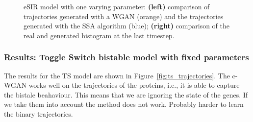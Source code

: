 \documentclass{article}
\begin{document}
\begin{figure}[ht]
    \caption{eSIR model with one varying parameter: \textbf{(left)} comparison of trajectories generated with a WGAN (orange) and the trajectories generated with the SSA algorithm (blue); \textbf{(right)} comparison of the real and generated histogram at the last timestep.}
    \label{fig:esir_trajectories}
    \end{figure} 




\subsubsection{Results: Toggle Switch bistable model with fixed parameters}

The results for the TS model are shown in Figure~\ref{fig:ts_trajectories}. The c-WGAN works well on the trajectories of the proteins, i.e., it is able to capture the bistale beahaviour. This means that we are ignoring the state of the genes. If we take them into account the method does not work. Probably harder to learn the binary trajectories.
\end{document}
